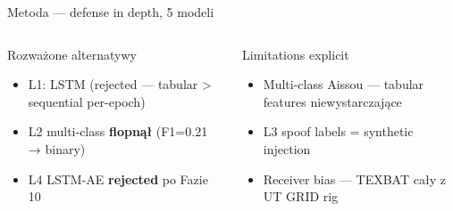 \documentclass[10pt,aspectratio=169]{beamer}
\begin{document}
\begin{frame}{Metoda — defense in depth, 5 modeli}

    \vspace{0.15cm}
    \begin{columns}[T,onlytextwidth]
        \begin{exampleblock}{Rozważone alternatywy}
            \scriptsize
            \begin{itemize}\setlength\itemsep{0.05em}
                \item L1: LSTM (rejected — tabular > sequential per-epoch)
                \item L2 multi-class \textbf{flopnął} (F1=0.21 → binary)
                \item L4 LSTM-AE \textbf{rejected} po Fazie 10
            \end{itemize}
        \end{exampleblock}
        \begin{alertblock}{Limitations explicit}
            \scriptsize
            \begin{itemize}\setlength\itemsep{0.05em}
                \item Multi-class Aissou — tabular features niewystarczające
                \item L3 spoof labels = synthetic injection
                \item Receiver bias — TEXBAT cały z UT GRID rig
            \end{itemize}
        \end{alertblock}
    \end{columns}
\end{frame}
\end{document}
